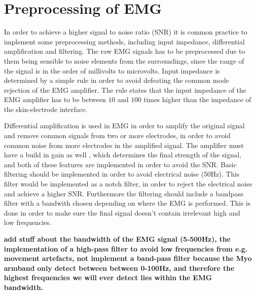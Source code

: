 \section{Preprocessing of EMG}

In order to achieve a higher signal to noise ratio (SNR) it is common practice to implement some preprocessing methods, including input impedance, differential amplification and filtering. The raw EMG signals has to be preprocessed due to them being sensible to noise elements from the surroundings, since the range of the signal is in the order of millivolts to microvolts. Input impedance is determined by a simple rule in order to avoid defeating the common mode rejection of the EMG amplifier. The rule states that the input impedance of the EMG amplifier has to be between $10$ and $100$ times higher than the impedance of the skin-electrode interface.\cite{cram2012}

Differential amplification is used in EMG in order to amplify the original signal and remove common signals from two or more electrodes, in order to avoid common noise from more electrodes in the amplified signal. The amplifier must have a build in gain as well , which determines the final strength of the signal, and both of these features are implemented in order to avoid the SNR. Basic filtering should be implemented in order to avoid electrical noise (50Hz). This filter would be implemented as a notch filter, in order to reject the electrical noise and achieve a higher SNR. Furthermore the filtering should include a bandpass filter with a bandwith chosen depending on where the EMG is performed. This is done in order to make sure the final signal doesn't contain irrelevant high and low frequencies.\cite{cram2012}

\textbf{add stuff about the bandwidth of the EMG signal (5-500Hz), the implementation of a high-pass filter to avoid low frequencies from e.g. movement artefacts, not implement a band-pass filter because the Myo armband only detect between between 0-100Hz, and therefore the highest frequencies we will ever detect lies within the EMG bandwidth.}